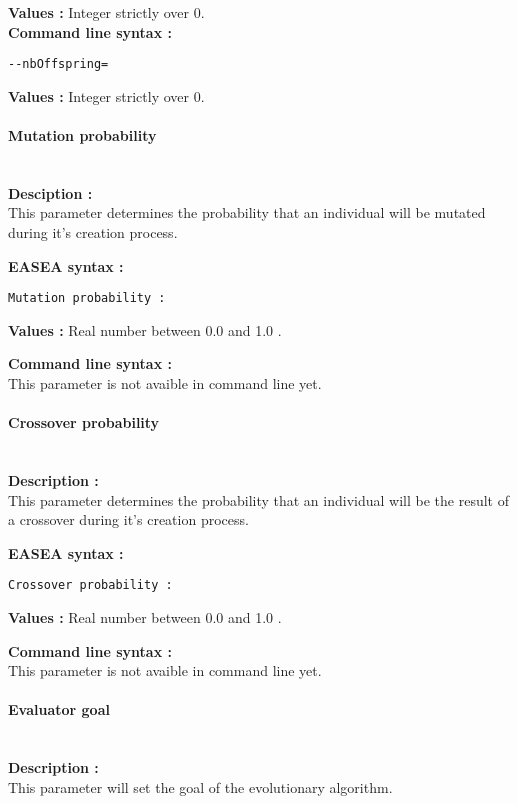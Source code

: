 \documentclass{book}
\begin{document}
\textbf{Values :} Integer strictly over 0.\\ \textbf{Command line syntax
:}

\texttt{-{}-nbOffspring=}

\textbf{Values :} Integer strictly over 0.\\

\paragraph{Mutation probability}\label{mutation-probability}
~\\

\textbf{Desciption :}\\This parameter determines the probability that an
individual will be mutated during it's creation process.

\textbf{EASEA syntax :}

\texttt{Mutation~probability~:}

\textbf{Values :} Real number between 0.0 and 1.0 .

\textbf{Command line syntax :}\\This parameter is not avaible in command
line yet.

\paragraph{Crossover probability}\label{crossover-probability}
~\\

\textbf{Description :}\\This parameter determines the probability that
an individual will be the result of a crossover during it's creation
process.

\textbf{EASEA syntax :}

\texttt{Crossover~probability~:}

\textbf{Values :} Real number between 0.0 and 1.0 .

\textbf{Command line syntax :}\\This parameter is not avaible in command
line yet.

\paragraph{Evaluator goal}\label{evaluator-goal}
~\\

\textbf{Description :}\\This parameter will set the goal of the
evolutionary algorithm.
\end{document}
